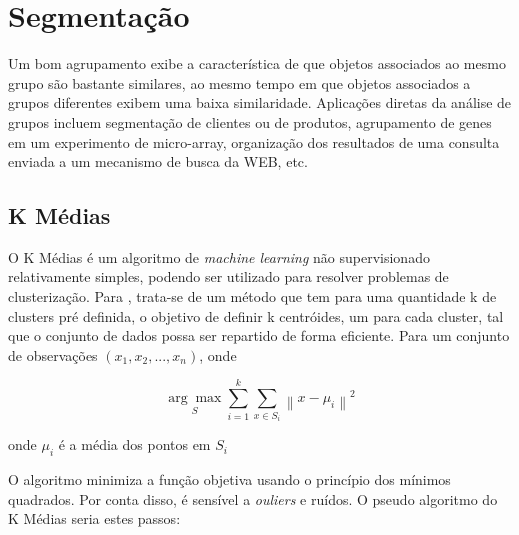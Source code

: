 \section{Segmentação}

\begin{citacao} 


Um bom agrupamento exibe a característica de que objetos associados ao mesmo grupo são bastante similares, ao mesmo tempo em que objetos associados a grupos diferentes exibem uma baixa similaridade. Aplicações diretas da análise de grupos incluem segmentação de clientes ou de produtos, agrupamento de genes em um experimento de micro-array, organização dos resultados de uma consulta enviada a um mecanismo de busca da WEB, etc.
\cite{BEZERRA} \end{citacao}


\subsection{K Médias}

O K Médias é um algoritmo de \emph{machine learning} não supervisionado relativamente simples, podendo ser utilizado para resolver problemas de clusterização. Para , trata-se de um método que tem para uma quantidade k de clusters pré definida, o objetivo de definir k centróides\footnotemark {}, um para cada cluster, tal que o conjunto de dados possa ser repartido de forma eficiente. Para um conjunto de observações \begin{math}(x_{1}, x_{2}, ..., x_{n})\end{math}, onde 

\begin{equation}
\label{eq:media}
\underset{S}{\arg\max} \sum_{i=1}^{k} \sum_{x \in S_{i}}\left \| x - \mu_{i} \right \|^{2}
\end{equation}

onde \begin{math}\mu_{i}\end{math} é a média dos pontos em \begin{math}S_{i}\end{math}

O algoritmo minimiza a função objetiva usando o princípio dos mínimos quadrados. Por conta disso, é sensível a \emph{ouliers} e ruídos. O pseudo algoritmo do K Médias seria estes passos:\\

